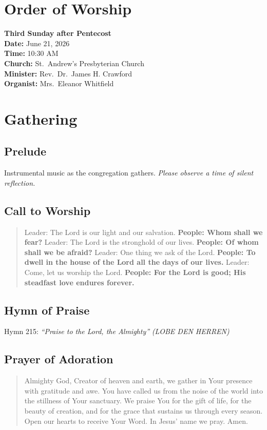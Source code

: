 \documentclass[
    language=english,
    doctype=liturgy,
    institution=none,
]{../../omnilatex}
\begin{document}
\maketitle

\section{Order of Worship}

\noindent\textbf{Third Sunday after Pentecost} \\
\textbf{Date:} June 21, 2026 \\
\textbf{Time:} 10:30 AM \\
\textbf{Church:} St.\ Andrew's Presbyterian Church \\
\textbf{Minister:} Rev.\ Dr.\ James H. Crawford \\
\textbf{Organist:} Mrs.\ Eleanor Whitfield

\section{Gathering}

\subsection{Prelude}
Instrumental music as the congregation gathers. \textit{Please observe a time of silent reflection.}

\subsection{Call to Worship}
\begin{quote}
Leader: The Lord is our light and our salvation.
\textbf{People: Whom shall we fear?}
Leader: The Lord is the stronghold of our lives.
\textbf{People: Of whom shall we be afraid?}
Leader: One thing we ask of the Lord.
\textbf{People: To dwell in the house of the Lord all the days of our lives.}
Leader: Come, let us worship the Lord.
\textbf{People: For the Lord is good; His steadfast love endures forever.}
\end{quote}

\subsection{Hymn of Praise}
Hymn 215: \textit{``Praise to the Lord, the Almighty''}
\textit{(LOBE DEN HERREN)}

\subsection{Prayer of Adoration}
\begin{quote}
Almighty God, Creator of heaven and earth, we gather in Your presence with gratitude and awe. You have called us from the noise of the world into the stillness of Your sanctuary. We praise You for the gift of life, for the beauty of creation, and for the grace that sustains us through every season. Open our hearts to receive Your Word. In Jesus' name we pray. Amen.
\end{quote}
\end{document}
